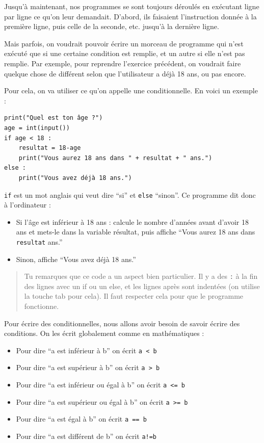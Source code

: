 \documentclass[a4paper,french,11pt]{article}
\begin{document}
Jusqu'à maintenant, nos programmes se sont toujours déroulés en
exécutant ligne par ligne ce qu'on leur demandait. D'abord, ils
faisaient l'instruction donnée à la première ligne, puis celle de la
seconde, etc. jusqu'à la dernière ligne.

Mais parfois, on voudrait pouvoir écrire un morceau de programme qui
n'est exécuté que si une certaine condition est remplie, et un autre si
elle n'est pas remplie. Par exemple, pour reprendre l'exercice
précédent, on voudrait faire quelque chose de différent selon que
l'utilisateur a déjà 18 ans, ou pas encore.

Pour cela, on va utiliser ce qu'on appelle une conditionnelle. En voici
un exemple :

\begin{verbatim}
print("Quel est ton âge ?")
age = int(input())
if age < 18 :
    resultat = 18-age
    print("Vous aurez 18 ans dans " + resultat + " ans.")
else :
    print("Vous avez déjà 18 ans.")
\end{verbatim}

\texttt{if} est un mot anglais qui veut dire ``si'' et
\texttt{else} ``sinon''. Ce programme dit donc à
l'ordinateur :

\begin{itemize}
\item
  Si l'âge est inférieur à 18 ans : calcule le nombre d'années avant
  d'avoir 18 ans et mets-le dans la variable résultat, puis affiche
  ``Vous aurez 18 ans dans \texttt{resultat} ans.''
\item
  Sinon, affiche ``Vous avez déjà 18 ans.''
\end{itemize}

\begin{quote}
Tu remarques que ce code a un aspect bien particulier. Il y a des
\texttt{:} à la fin des lignes avec un if ou un else, et les
lignes après sont indentées (on utilise la touche tab pour cela). Il
faut respecter cela pour que le programme fonctionne.
\end{quote}

Pour écrire des conditionnelles, nous allons avoir besoin de savoir
écrire des conditions. On les écrit globalement comme en mathématiques :

\begin{itemize}
\item
  Pour dire ``a est inférieur à b'' on écrit \texttt{a < b}
\item
  Pour dire ``a est supérieur à b'' on écrit \texttt{a > b}
\item
  Pour dire ``a est inférieur ou égal à b'' on écrit
  \texttt{a <= b}
\item
  Pour dire ``a est supérieur ou égal à b'' on écrit
  \texttt{a >= b}
\item
  Pour dire ``a est égal à b'' on écrit \texttt{a == b}
\item
  Pour dire ``a est différent de b'' on écrit \texttt{a!=b}
\end{itemize}
\end{document}
